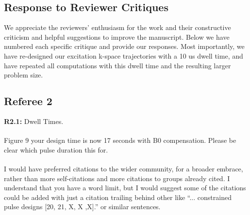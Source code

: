 \documentclass[11pt]{article}
\newcommand{\mysubsectionstar}[1]{\vspace{0mm}\subsection*{#1}\vspace{0mm}}
\begin{document}


\onecolumn

\setlength{\parskip}{0pt}

\clearpage
\newpage
\pagestyle{empty}		%

\footskip 15pt

\mysubsectionstar{Response to Reviewer Critiques}
We appreciate the reviewers' enthusiasm for the work and their constructive criticism and helpful suggestions to improve the manuscript.
Below we have numbered each specific critique and provide our responses.
Most importantly, we have re-designed our excitation k-space trajectories with a 10 us dwell time, 
and have repeated all computations with this dwell time and the resulting larger problem size. 


\mysubsectionstar{Referee 2}
{\bf R2.1:} Dwell Times.
\\[0.2em]
\indent{\it \textcolor{blue}{We agree that while it does not change the interpretation of our results or conclusions,
it would be best to perform the simulations with an actual vendor dwell time. 
We chose 10 microseconds since the scanner targeted for these pulses is a Siemens 7T.
All figures, error numbers and compute times have been updated with the 10 microsecond results.}}
\\[1.2em]

 Figure 9 your design time is now 17 seconds with B0 compensation. Please be clear which pulse duration this for.
\\[0.2em]
\indent{\it \textcolor{blue}{This design was with the full 10 millisecond-long trajectory, 
which was stated in the Methods: `With the exception of the simulations across undersampling factors, 
all pulse designs used this 10 ms trajectory.'}}
\\[1.2em]

 I would have preferred citations to the wider community, for a broader embrace, rather than more self-citations and more citations to groups already cited. I understand that you have a word limit, but I would suggest some of the citations could be added with just a citation trailing behind other like ``... constrained pulse designs [20, 21, X, X ,X].'' or similar sentences.
\\[0.2em]
\indent{\it \textcolor{blue}{We have reviewed each category of citations in the manuscript
and we respectfully disagree that more are required.
Out of the manuscript's 32 citations, 
25 are on different pulse design methods and two are review articles that cite yet more.
We are happy to add specific citations if the referee has some in mind.}}
\\[1.2em]
\end{document}
